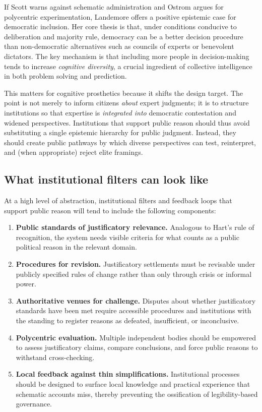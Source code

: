 \documentclass[12pt]{report}
\begin{document}
If Scott warns against schematic administration and Ostrom argues for polycentric experimentation, Landemore offers a positive epistemic case for democratic inclusion.
Her core thesis is that, under conditions conducive to deliberation and majority rule, democracy can be a better decision procedure than non-democratic alternatives such as councils of experts or benevolent dictators. \parencite[p.~3]{landemore2013democratic}
The key mechanism is that including more people in decision-making tends to increase \emph{cognitive diversity}, a crucial ingredient of collective intelligence in both problem solving and prediction. \parencite[pp.~3--4]{landemore2013democratic}

This matters for cognitive prosthetics because it shifts the design target.
The point is not merely to inform citizens \emph{about} expert judgments; it is to structure institutions so that expertise is \emph{integrated into} democratic contestation and widened perspectives.
Institutions that support public reason should thus avoid substituting a single epistemic hierarchy for public judgment.
Instead, they should create public pathways by which diverse perspectives can test, reinterpret, and (when appropriate) reject elite framings.

\subsection{What institutional filters can look like}

At a high level of abstraction, institutional filters and feedback loops that support public reason will tend to include the following components:

\begin{enumerate}
    \item \textbf{Public standards of justificatory relevance.} Analogous to Hart’s rule of recognition, the system needs visible criteria for what counts as a public political reason in the relevant domain. \parencite[pp.~94--95]{hart2012concept}
    \item \textbf{Procedures for revision.} Justificatory settlements must be revisable under publicly specified rules of change rather than only through crisis or informal power. \parencite[pp.~95--96]{hart2012concept}
    \item \textbf{Authoritative venues for challenge.} Disputes about whether justificatory standards have been met require accessible procedures and institutions with the standing to register reasons as defeated, insufficient, or inconclusive. \parencite[p.~97]{hart2012concept}
    \item \textbf{Polycentric evaluation.} Multiple independent bodies should be empowered to assess justificatory claims, compare conclusions, and force public reasons to withstand cross-checking. \parencite[p.~643]{ostrom2010polycentric}
    \item \textbf{Local feedback against thin simplifications.} Institutional processes should be designed to surface local knowledge and practical experience that schematic accounts miss, thereby preventing the ossification of legibility-based governance. \parencite[pp.~2--3, 309]{scott1998seeing}
\end{enumerate}
\end{document}
